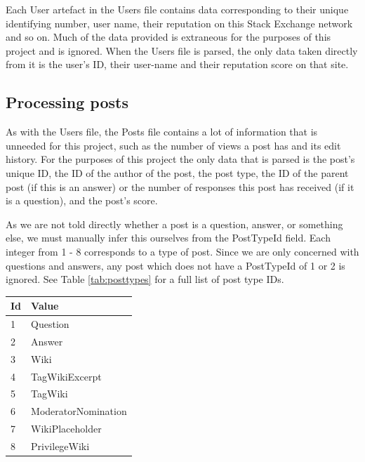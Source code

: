 \documentclass[]{final_report}
\begin{document}
Each User artefact in the Users file contains data corresponding to their unique identifying number, user name, their reputation on this Stack Exchange network and so on. Much of the data provided is extraneous for the purposes of this project and is ignored. When the Users file is parsed, the only data taken directly from it is the user's ID, their user-name and their reputation score on that site.

\subsection{Processing posts}

As with the Users file, the Posts file contains a lot of information that is unneeded for this project, such as the number of views a post has and its edit history. For the purposes of this project the only data that is parsed is the post's unique ID, the ID of the author of the post, the post type, the ID of the parent post (if this is an answer) or the number of responses this post has received (if it is a question), and the post's score.

As we are not told directly whether a post is a question, answer, or something else, we must manually infer this ourselves from the PostTypeId field. Each integer from 1 - 8 corresponds to a type of post. Since we are only concerned with questions and answers, any post which does not have a PostTypeId of 1 or 2 is ignored. See Table \ref{tab:posttypes} for a full list of post type IDs.

\begin{minipage}{\linewidth}
\centering
\begin{tabular}{|l|l|}
\hline \textbf{Id} & \textbf{Value} \\ 
\hline 1 & Question \\ 
\hline 2 & Answer \\ 
\hline 3 & Wiki \\ 
\hline 4 & TagWikiExcerpt \\ 
\hline 5 & TagWiki \\ 
\hline 6 & ModeratorNomination \\ 
\hline 7 & WikiPlaceholder \\ 
\hline 8 & PrivilegeWiki \\
\hline 
\end{tabular}\par
{} \label{tab:posttypes}
\end{minipage}
\end{document}

